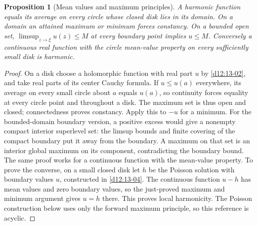\documentclass[11pt,a4paper,openany]{book}
\newtheorem{proposition}[theorem]{Proposition}
\theoremstyle{definition}
\theoremstyle{remark}\newtheorem{remark}[theorem]{Remark}
\newcommand{\family}[1]{}
\begin{document}
\begin{proposition}[Mean values and maximum principles]\family{D12.13.03}\label{d12:13-03}
A harmonic function equals its average on every circle whose closed disk lies in its domain. On a domain an attained maximum or minimum forces constancy. On a bounded open set, $\limsup_{z\to\xi}u(z)\le M$ at every boundary point implies $u\le M$. Conversely a continuous real function with the circle mean-value property on every sufficiently small disk is harmonic.
\end{proposition}
\begin{proof}
On a disk choose a holomorphic function with real part $u$ by \cref{d12:13-02}, and take real parts of its center Cauchy formula. If $u\le u(a)$ everywhere, its average on every small circle about $a$ equals $u(a)$, so continuity forces equality at every circle point and throughout a disk. The maximum set is thus open and closed; connectedness proves constancy. Apply this to $-u$ for a minimum. For the bounded-domain boundary version, a positive excess would give a nonempty compact interior superlevel set: the limsup bounds and finite covering of the compact boundary put it away from the boundary. A maximum on that set is an interior global maximum on its component, contradicting the boundary bound. The same proof works for a continuous function with the mean-value property. To prove the converse, on a small closed disk let $h$ be the Poisson solution with boundary values $u$, constructed in \cref{d12:13-04}. The continuous function $u-h$ has mean values and zero boundary values, so the just-proved maximum and minimum argument gives $u=h$ there. This proves local harmonicity. The Poisson construction below uses only the forward maximum principle, so this reference is acyclic.
\end{proof}
\end{document}
